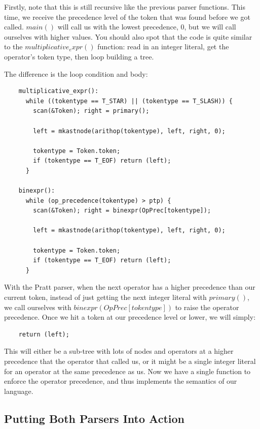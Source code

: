 \documentclass[journal, onecolumn, 12pt]{IEEEtran}
\begin{document}
Firstly, note that this is still recursive like the previous parser functions.
This time, we receive the precedence level of the token that was found before we got called. $main()$ will call us with the lowest precedence, 0, but we will call ourselves with higher values. You should also spot that the code is quite similar to the $multiplicative_expr()$ function: read in an integer literal, get the operator's token type, then loop building a tree.

The difference is the loop condition and body:

\begin{lstlisting}
    multiplicative_expr():
      while ((tokentype == T_STAR) || (tokentype == T_SLASH)) {
        scan(&Token); right = primary();

        left = mkastnode(arithop(tokentype), left, right, 0);

        tokentype = Token.token;
        if (tokentype == T_EOF) return (left);
      }

    binexpr():
      while (op_precedence(tokentype) > ptp) {
        scan(&Token); right = binexpr(OpPrec[tokentype]);

        left = mkastnode(arithop(tokentype), left, right, 0);

        tokentype = Token.token;
        if (tokentype == T_EOF) return (left);
      }
\end{lstlisting}

With the Pratt parser, when the next operator has a higher precedence than our current token, instead of just getting the next integer literal with $primary()$, we call ourselves with $binexpr(OpPrec[tokentype])$ to raise the operator precedence. Once we hit a token at our precedence level or lower, we will simply:

\begin{lstlisting}
    return (left);
\end{lstlisting}

This will either be a sub-tree with lots of nodes and operators at a higher precedence that the operator that called us, or it might be a single integer literal for an operator at the same precedence as us. Now we have a single function to enforce the operator precedence, and thus implements the semantics of our language.

\subsection{Putting Both Parsers Into Action}
\end{document}
